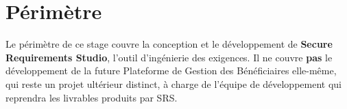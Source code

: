 \section{Périmètre}
Le périmètre de ce stage couvre la conception et le développement de
\textbf{Secure Requirements Studio}, l'outil d'ingénierie des exigences. Il ne couvre
\textbf{pas} le développement de la future Plateforme de Gestion des Bénéficiaires
elle-même, qui reste un projet ultérieur distinct, à charge de l'équipe de
développement qui reprendra les livrables produits par SRS.
